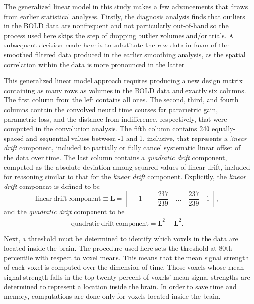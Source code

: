 
\par The generalized linear model in this study makes a few advancements that
draws from earlier statistical analyses. Firstly, the diagnosis analysis finds
that outliers in the BOLD data are nonfrequent and not particularly out-of-hand
so the process used here skips the step of dropping outlier volumes and/or
trials. A subsequent decision made here is to substitute the raw data in favor
of the smoothed filtered data produced in the earlier smoothing analysis, as the
spatial correlation within the data is more pronounced in the latter.

\par \indent This generalized linear model approach requires producing a new
design matrix containing as many rows as volumes in the BOLD data and exactly
six columns. The first column from the left contains all ones. The second,
third, and fourth columns contain the convolved neural time courses for
parametric gain, parametric loss, and the distance from indifference,
respectively, that were computed in the convolution analysis. The fifth column
contains 240 equally-spaced and sequential values between -1 and 1, inclusive,
that represents a \textit{linear drift} component, included to partially or
fully cancel systematic linear offset of the data over time. The last column
contains a \textit{quadratic drift} component, computed as the absolute
deviation among squared values of linear drift, included for reasoning similar
to that for the \textit{linear drift} component. Explicitly, the \textit{linear
drift} component is defined to be
\[
\mathrm{ linear \ drift \ component } \equiv \mathbf{ L } = \left[ \; -1 \quad
-\frac{ 237 }{ 239 } \quad \ldots \quad \frac{ 237 }{ 239 } \quad 1 \; \right] ,
\]
and the \textit{quadratic drift} component to be
\[
\mathrm{ quadratic \ drift \ component } = \mathbf{ L }^{ 2 } -
\bar{ \mathbf{ L }^{ 2 } } .
\]

\par \indent Next, a threshold must be determined to identify which voxels in
the data are located inside the brain. The procedure used here sets the
threshold at 80th percentile with respect to voxel means. This means that the
mean signal strength of each voxel is computed over the dimension of time. Those
voxels whose mean signal strength falls in the top twenty percent of voxels'
mean signal strengths are determined to represent a location inside the brain.
In order to save time and memory, computations are done only for voxels located
inside the brain.

